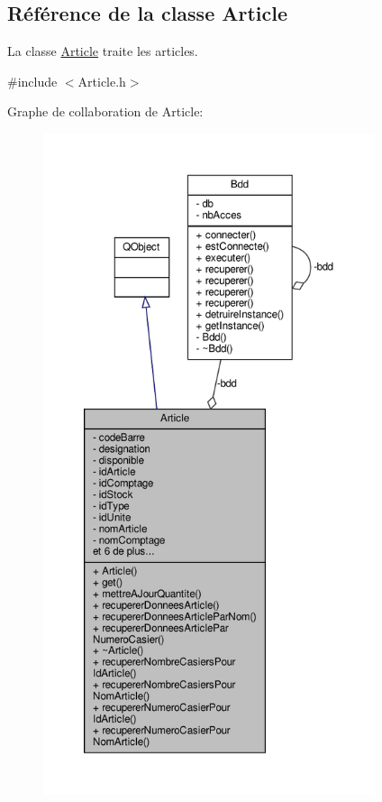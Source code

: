 \hypertarget{class_article}{}\subsection{Référence de la classe Article}
\label{class_article}


La classe \hyperlink{class_article}{Article} traite les articles.  




{\ttfamily \#include $<$Article.\+h$>$}



Graphe de collaboration de Article\+:
\nopagebreak
\begin{figure}[H]
\begin{center}
\leavevmode
\includegraphics[height=550pt]{class_article__coll__graph}
\end{center}
\end{figure}
